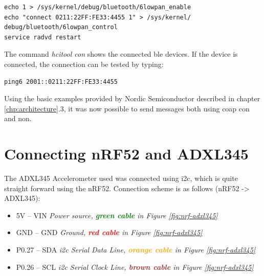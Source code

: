 \begin{verbatim}
echo 1 > /sys/kernel/debug/bluetooth/6lowpan_enable
echo "connect 0211:22FF:FE33:4455 1" > /sys/kernel/
debug/bluetooth/6lowpan_control
service radvd restart
\end{verbatim} 

The command \textit{hcitool con} shows the connected \gls{ble} devices. If the device is connected, the connection can be tested by typing:

\begin{verbatim}
ping6 2001::0211:22FF:FE33:4455
\end{verbatim}


Using the basic examples provided by Nordic Semiconductor described in chapter \ref{chp:architecture}.3, it was now possible to send messages both using \gls{coap} \gls{con} and \gls{non}.  


\section{Connecting nRF52 and ADXL345}


The ADXL345 Accelerometer used was connected using \gls{i2c}, which is quite straight forward using the nRF52. Connection scheme is as follows (nRF52 -> ADXL345): 

\begin{itemize}
  \item 5V -- VIN		\tab  	\textit{Power source, \textbf{\textcolor{green}{green cable}} in Figure \ref{fig:nrf-adxl345}}
  \item GND -- GND 		\tab 	\textit{Ground, \textbf{\textcolor{red}{red cable}} in Figure \ref{fig:nrf-adxl345}}
  \item P0.27 -- SDA	\tab	\textit{\gls{i2c} Serial Data Line, \textbf{\textcolor{orange}{orange cable}} in Figure \ref{fig:nrf-adxl345}}
  \item P0.26 -- SCL	\tab 	\textit{\gls{i2c} Serial Clock Line, \textbf{\textcolor{brown}{brown cable}} in Figure \ref{fig:nrf-adxl345}}
\end{itemize} 



